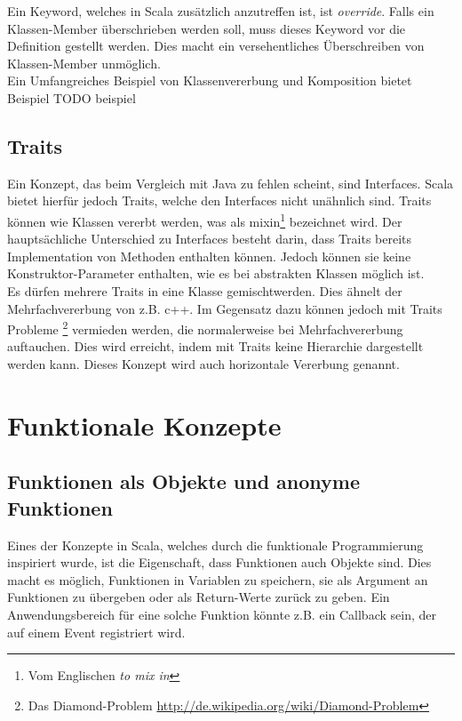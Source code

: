 Ein Keyword, welches in Scala zusätzlich anzutreffen ist, ist 
\emph{override}. Falls ein Klassen-Member überschrieben werden soll,
muss dieses Keyword vor die Definition gestellt werden. Dies macht
ein versehentliches Überschreiben von Klassen-Member unmöglich.\\

Ein Umfangreiches Beispiel von Klassenvererbung und Komposition bietet
Beispiel TODO beispiel

\subsection{Traits}

Ein Konzept, das beim Vergleich mit Java zu fehlen scheint, sind 
Interfaces. Scala bietet hierfür jedoch Traits, welche
den Interfaces nicht unähnlich sind. Traits können wie Klassen
vererbt werden, was als \glqq mixin\grqq \footnote{Vom Englischen \emph{to mix in}}
bezeichnet wird. Der hauptsächliche Unterschied zu Interfaces besteht 
darin, dass Traits bereits Implementation von Methoden enthalten
können. Jedoch können sie keine Konstruktor-Parameter enthalten,
wie es bei abstrakten Klassen möglich ist.\\

Es dürfen mehrere Traits in eine Klasse \glqq gemischt\grqq werden. Dies
ähnelt der Mehrfachvererbung von z.B. c++. Im Gegensatz dazu können
jedoch mit Traits Probleme
\footnote{Das Diamond-Problem 
\href{http://de.wikipedia.org/wiki/Diamond-Problem}
{http://de.wikipedia.org/wiki/Diamond-Problem}} vermieden werden, die 
normalerweise bei Mehrfachvererbung auftauchen. Dies wird erreicht,
indem mit Traits keine Hierarchie dargestellt werden kann. Dieses
Konzept wird auch horizontale Vererbung genannt.

\section{Funktionale Konzepte}

\subsection{Funktionen als Objekte und anonyme Funktionen}
\label{sec:functionsObjects}

Eines der Konzepte in Scala, welches durch die funktionale Programmierung
inspiriert wurde, ist die Eigenschaft, dass Funktionen auch Objekte
sind. Dies macht es möglich, Funktionen in Variablen zu speichern, sie
als Argument an Funktionen zu übergeben oder als Return-Werte zurück zu
geben. Ein Anwendungsbereich für eine solche Funktion könnte z.B. ein
Callback sein, der auf einem Event registriert wird.\\

